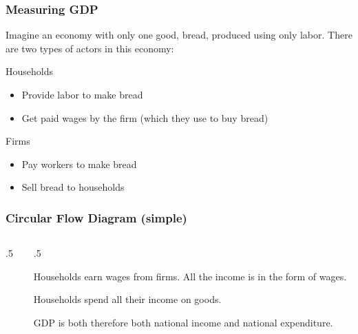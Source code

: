 \documentclass[aspectratio=169]{beamer}
\newenvironment{wideitemize}{\itemize\addtolength{\itemsep}{10pt}}{\enditemize}
\begin{document}
\begin{frame}
\frametitle{Measuring GDP}
\begin{wideitemize}
\item Imagine an economy with only one good, bread, produced using only labor.  There are two types of actors in this economy:

\begin{wideitemize}
\item Households
\begin{itemize}
\item Provide labor to make bread
\item Get paid wages by the firm (which they use to buy bread)
\end{itemize}
\item Firms
\begin{itemize}
\item Pay workers to make bread
\item Sell bread to households
\end{itemize}\end{wideitemize}
\end{wideitemize}
\end{frame}


\begin{frame}
\frametitle{Circular Flow Diagram (simple)}
\begin{columns}
\begin{column}{.5\textwidth}
\resizebox{\textwidth}{.5\textheight}{}
\end{column}

\begin{column}{.5\textwidth}
\begin{wideitemize}
\item Households earn wages from firms.  All the income is in the form of wages.
\item Households spend all their income on goods.
\item GDP is both therefore both national income and national expenditure.
\end{wideitemize}
\end{column}
\end{columns}
\end{frame}
\end{document}

